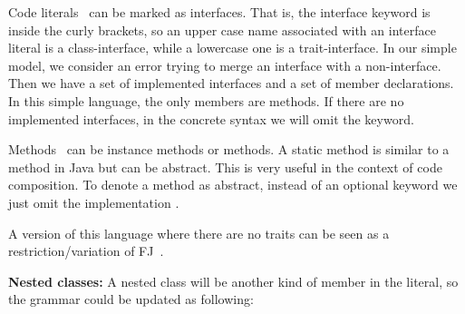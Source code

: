 Code literals \mL\ can be marked as interfaces. 
That is, the interface keyword is inside the curly brackets, so an upper case name associated with an interface literal is a class-interface, while a lowercase one is a trait-interface.
In our simple model, we consider an error trying to merge an interface with a non-interface.
 Then we have a set of implemented interfaces and a set of member
  declarations. In this simple language, the only members are methods.
If there are no implemented interfaces, in the concrete syntax we will omit the \Q@implements@ keyword.

Methods \mMD~can be instance methods or \Q@static@ methods. A static method is similar to a \Q@static@ method in Java but can be abstract. This is very useful in the context of code composition.
To denote a method as abstract, instead of an optional keyword we just omit the implementation \me.

A version of this language where there are no traits can be seen 
as a restriction/variation of FJ~\cite{igarashi2001featherweight}.

\noindent\textbf{Nested classes:}
A nested class will be another kind of member in the literal, so  
the grammar could be updated as following:

\begin{bnf}
\prodFull{}\\
\prodFull{}
\end{bnf}\\


